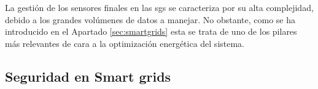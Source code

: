 \vspace{3mm}

La gestión de los sensores finales en las \gls{sg}s se caracteriza por su alta complejidad, debido a los grandes volúmenes de datos a manejar. No obstante, como se ha introducido en el Apartado \ref{sec:smartgrids} esta se trata de uno de los pilares más relevantes de cara a la optimización energética del sistema.

 











\subsection{Seguridad en Smart grids}




